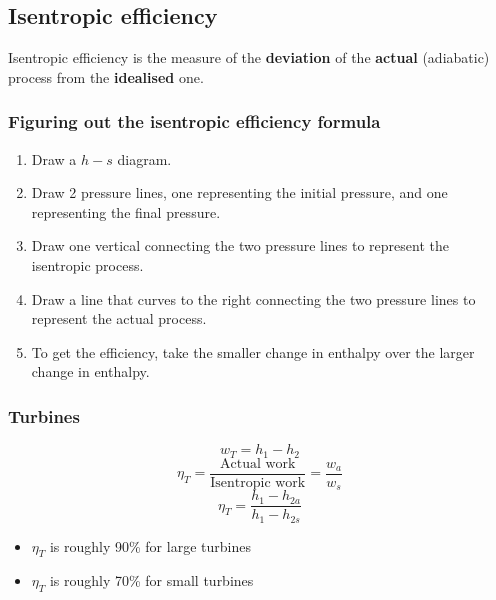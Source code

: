 \documentclass[11pt]{article}
\begin{document}
\subsection{Isentropic efficiency}
\label{sec:org99ef1c4}
Isentropic efficiency is the measure of the \textbf{deviation} of the \textbf{actual} (adiabatic) process from the \textbf{idealised} one.
\subsubsection{Figuring out the isentropic efficiency formula}
\label{sec:orga20db72}
\begin{enumerate}
\item Draw a \(h-s\) diagram.
\item Draw 2 pressure lines, one representing the initial pressure, and one representing the final pressure.
\item Draw one vertical connecting the two pressure lines to represent the isentropic process.
\item Draw a line that curves to the right connecting the two pressure lines to represent the actual process.
\item To get the efficiency, take the smaller change in enthalpy over the larger change in enthalpy.
\end{enumerate}

 \newpage
\subsubsection{Turbines}
\label{sec:orgf3a6e25}
\[w_T = h_1 - h_2\]
\[\eta_T = \frac{\text{Actual work}}{\text{Isentropic work}} = \frac{w_a}{w_s}\]
\[\eta_T = \frac{h_1 - h_{2a}}{h_1 - h_{2s}}\]

\begin{itemize}
\item \(\eta_T\) is roughly 90\% for large turbines
\item \(\eta_T\) is roughly 70\% for small turbines
\end{itemize}
\end{document}
